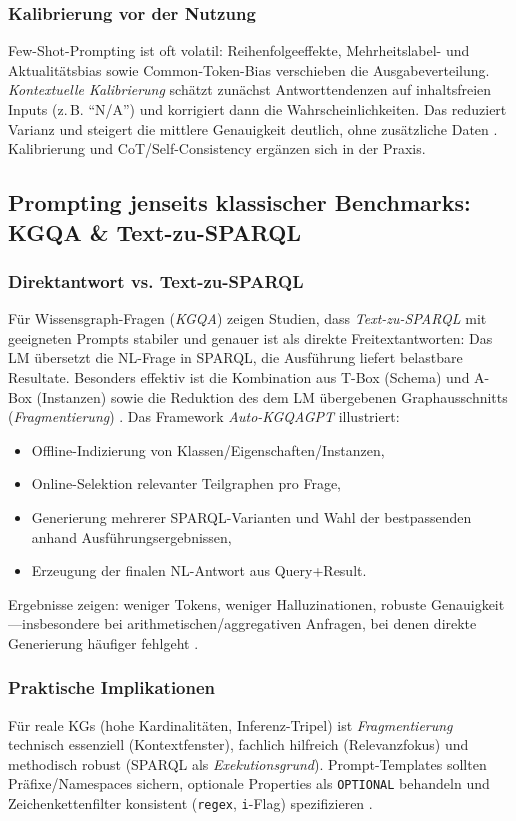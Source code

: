 \subsubsection{Kalibrierung vor der Nutzung}
Few-Shot-Prompting ist oft volatil: Reihenfolgeeffekte, Mehrheitslabel- und Aktualitätsbias sowie Common-Token-Bias verschieben die Ausgabeverteilung. \emph{Kontextuelle Kalibrierung} schätzt zunächst Antworttendenzen auf inhaltsfreien Inputs (z.\,B. ``N/A'') und korrigiert dann die Wahrscheinlichkeiten. Das reduziert Varianz und steigert die mittlere Genauigkeit deutlich, ohne zusätzliche Daten \cite{zhao2021calibrate}. Kalibrierung und CoT/Self-Consistency ergänzen sich in der Praxis.

\subsection{Prompting jenseits klassischer Benchmarks: KGQA \& Text-zu-SPARQL}
\subsubsection{Direktantwort vs. Text-zu-SPARQL}
Für Wissensgraph-Fragen (\emph{KGQA}) zeigen Studien, dass \emph{Text-zu-SPARQL} mit geeigneten Prompts stabiler und genauer ist als direkte Freitextantworten: Das LM übersetzt die NL-Frage in SPARQL, die Ausführung liefert belastbare Resultate. Besonders effektiv ist die Kombination aus T-Box (Schema) und A-Box (Instanzen) sowie die Reduktion des dem LM übergebenen Graphausschnitts (\emph{Fragmentierung}) \cite{avila2024autokgqagpt}. Das Framework \emph{Auto-KGQAGPT} illustriert:
\begin{itemize}
  \item Offline-Indizierung von Klassen/Eigenschaften/Instanzen,
  \item Online-Selektion relevanter Teilgraphen pro Frage,
  \item Generierung mehrerer SPARQL-Varianten und Wahl der bestpassenden anhand Ausführungsergebnissen,
  \item Erzeugung der finalen NL-Antwort aus Query+Result.
\end{itemize}
Ergebnisse zeigen: weniger Tokens, weniger Halluzinationen, robuste Genauigkeit—insbesondere bei arithmetischen/aggregativen Anfragen, bei denen direkte Generierung häufiger fehlgeht \cite{avila2024autokgqagpt}.

\subsubsection{Praktische Implikationen}
Für reale KGs (hohe Kardinalitäten, Inferenz-Tripel) ist \emph{Fragmentierung} technisch essenziell (Kontextfenster), fachlich hilfreich (Relevanzfokus) und methodisch robust (SPARQL als \emph{Exekutionsgrund}). Prompt-Templates sollten Präfixe/Namespaces sichern, optionale Properties als \texttt{OPTIONAL} behandeln und Zeichenkettenfilter konsistent (\texttt{regex}, \texttt{i}-Flag) spezifizieren \cite{avila2024autokgqagpt}.

